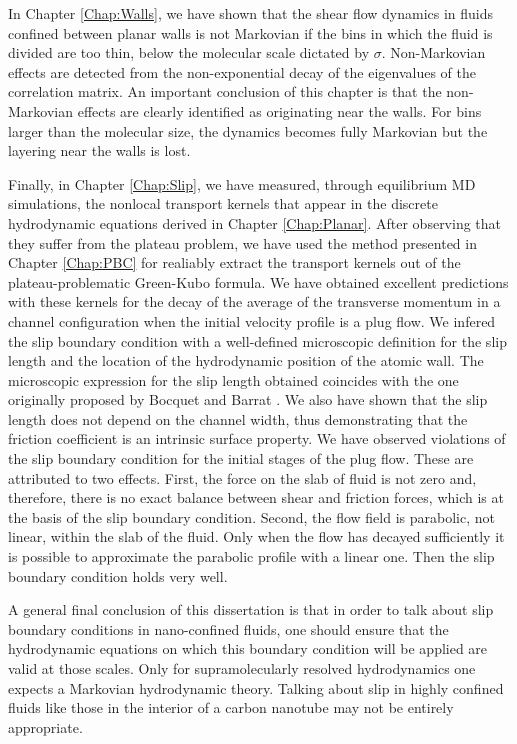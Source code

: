 \documentclass[b5paper,openright,10pt]{book}
\begin{document}
In  Chapter  \ref{Chap:Walls},  we  have shown  that  the  shear  flow
dynamics in fluids  confined between planar walls is  not Markovian if
the bins  in which the fluid  is divided are too  thin, below the
  molecular scale dictated by $\sigma$. 
  Non-Markovian effects are  detected from
the  non-exponential  decay  of  the eigenvalues  of  the  correlation
matrix. An  important conclusion  of this chapter  is that  the
non-Markovian effects  are clearly identified as  originating near the
walls. For bins  larger than the molecular size,  the dynamics becomes
fully Markovian but the layering near the
walls is lost. 

Finally,  in  Chapter  \ref{Chap:Slip},   we  have  measured,  through
equilibrium MD simulations, the nonlocal transport kernels that appear
in   the   discrete   hydrodynamic  equations   derived   in   Chapter
\ref{Chap:Planar}.   After  observing  that  they
suffer from the plateau problem, we  have used the method presented in
Chapter  \ref{Chap:PBC} for  realiably extract
the  transport  kernels  out  of  the  plateau-problematic  Green-Kubo
formula.   We have  obtained  excellent  predictions with  these
kernels for  the decay of the  average of
the transverse  momentum in a  channel configuration when  the initial
velocity  profile  is a  plug  flow.   We  infered the  slip  boundary
condition  with a  well-defined  microscopic definition  for the  slip
length and  the location  of the hydrodynamic  position of  the atomic
wall.   The  microscopic  expression  for  the  slip  length  obtained
coincides  with the  one  originally proposed  by  Bocquet and  Barrat
\cite{Bocquet1994}.  We also have shown  that the slip length does not
depend  on the  channel width,  thus demonstrating  that the  friction
coefficient is an intrinsic surface property.  
We have  observed violations of  the slip boundary  condition for
  the initial  stages of the plug  flow.  These are attributed  to two
  effects. First,  the force  on the  slab of fluid  is not  zero and,
  therefore,  there is  no exact  balance between  shear and  friction
  forces,   which   is   at   the   basis   of   the   slip   boundary
  condition. Second, the  flow field is parabolic,  not linear, within
  the slab of  the fluid. Only when the flow  has decayed sufficiently
  it is  possible to approximate  the parabolic profile with  a linear
  one. Then the slip boundary condition holds very well.

A general final conclusion of this dissertation is that in order to talk
about slip boundary conditions in nano-confined fluids, one should ensure
that the hydrodynamic equations on which this boundary condition will be
applied are valid at those scales. Only for supramolecularly resolved hydrodynamics
one expects a Markovian hydrodynamic theory. Talking about slip in highly confined
fluids like those in the interior of a carbon nanotube may not be entirely appropriate.
\end{document}

